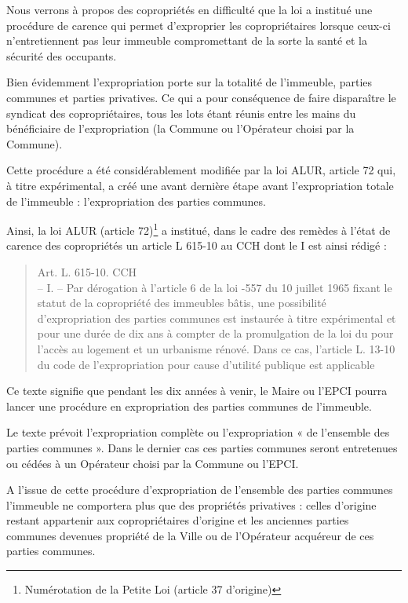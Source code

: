 		Nous verrons à propos des copropriétés en difficulté que la loi  a institué une procédure de carence qui permet d’exproprier les copropriétaires lorsque ceux-ci n’entretiennent pas leur immeuble compromettant de la sorte la santé et la sécurité des occupants.
	
		Bien évidemment l’expropriation porte sur la totalité de l’immeuble, parties communes et parties privatives. Ce qui a pour conséquence de faire disparaître le syndicat des copropriétaires, tous les lots étant réunis entre les mains du bénéficiaire de l’expropriation (la Commune ou l’Opérateur choisi par la Commune).

		Cette procédure a été considérablement modifiée par la loi ALUR, article 72 qui, à titre expérimental, a créé une avant dernière étape avant l’expropriation totale de l’immeuble : l’expropriation des parties communes.
	
		Ainsi, la loi ALUR (article 72)\footnote{Numérotation de la Petite Loi (article 37 d’origine)} a institué, dans le cadre des remèdes à l’état de carence des copropriétés un article L 615-10 au CCH dont le I est ainsi rédigé :
		\begin{quote}
			Art. L. 615-10. CCH\\
		– I. – Par dérogation à l’article 6 de la loi -557 du 10 juillet 1965 fixant le statut de la copropriété des immeubles bâtis, une possibilité d’expropriation des parties communes est instaurée à titre expérimental et pour une durée de dix ans à compter de la promulgation de la loi \no du pour l’accès au logement et un urbanisme rénové. Dans ce cas, l’article L. 13-10 du code de l’expropriation pour cause d’utilité publique est applicable
		\end{quote}
		
		Ce texte signifie que pendant les dix années à venir, le Maire ou l’EPCI pourra lancer une procédure en expropriation des parties communes de l’immeuble.
		
		Le texte prévoit l’expropriation complète ou l’expropriation « de l’ensemble des parties communes ». Dans le dernier cas ces parties communes seront entretenues ou cédées à un Opérateur choisi par la Commune ou l’EPCI.
		
		A l’issue de cette procédure d’expropriation de l’ensemble des parties communes l’immeuble ne comportera plus que des propriétés privatives : celles d’origine restant appartenir aux copropriétaires d’origine et les anciennes parties communes devenues propriété de la Ville ou de l’Opérateur acquéreur de ces parties communes.
		
